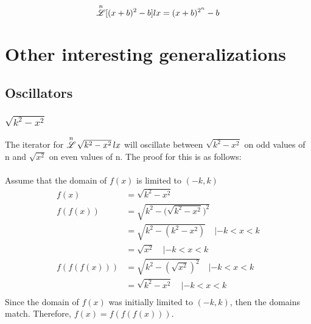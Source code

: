 \documentclass[12pt, letterpaper]{article}
\begin{document}
$$\overset{n}{\mathscr{L}}[(x+b)^2-b]lx=(x+b)^{2^n}-b$$

\section{Other interesting generalizations}

\subsection{Oscillators}
\subsubsection{$\sqrt{k^2-x^2}$}
The iterator for $\overset{n}{\mathscr{L}} \, \sqrt{k^2-x^2} \, lx$ will oscillate between $\sqrt{k^2-x^2}$ on odd values of n and $\sqrt{x^2}$ on even values of n. The proof for this is as follows:
\paragraph{}
Assume that the domain of $f(x)$ is limited to $(-k, k)$
\begin{align*}
        f(x) &= \sqrt{k^2 - x^2} \\
        f(f(x)) &= \sqrt{k^2 - \Big( \sqrt{k^2-x^2} \Big)^2} \\
                &= \sqrt{k^2 - (k^2-x^2) } \quad | -k < x < k \\
                &= \sqrt{x^2} \quad | -k < x < k \\
        f(f(f(x))) &= \sqrt{k^2 - (\sqrt{x^2})^2} \quad | -k < x < k \\
                   &= \sqrt{k^2 - x^2} \quad | -k < x < k \\ 
\end{align*}
Since the domain of $f(x)$ was initially limited to $(-k, k)$, then the domains match. Therefore, $f(x) = f(f(f(x)))$.
\end{document}
